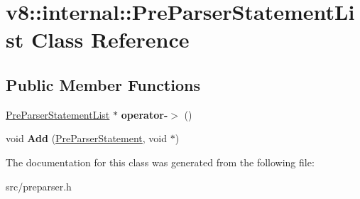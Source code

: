 \hypertarget{classv8_1_1internal_1_1_pre_parser_statement_list}{}\section{v8\+:\+:internal\+:\+:Pre\+Parser\+Statement\+List Class Reference}
\label{classv8_1_1internal_1_1_pre_parser_statement_list}
\subsection*{Public Member Functions}
\begin{DoxyCompactItemize}
\item 
\hypertarget{classv8_1_1internal_1_1_pre_parser_statement_list_af6c533693ed67339eb2b5d7ee93ce9a0}{}\hyperlink{classv8_1_1internal_1_1_pre_parser_statement_list}{Pre\+Parser\+Statement\+List} $\ast$ {\bfseries operator-\/$>$} ()\label{classv8_1_1internal_1_1_pre_parser_statement_list_af6c533693ed67339eb2b5d7ee93ce9a0}

\item 
\hypertarget{classv8_1_1internal_1_1_pre_parser_statement_list_a262be99fb66a0d996b372f9823cc92b7}{}void {\bfseries Add} (\hyperlink{classv8_1_1internal_1_1_pre_parser_statement}{Pre\+Parser\+Statement}, void $\ast$)\label{classv8_1_1internal_1_1_pre_parser_statement_list_a262be99fb66a0d996b372f9823cc92b7}

\end{DoxyCompactItemize}


The documentation for this class was generated from the following file\+:\begin{DoxyCompactItemize}
\item 
src/preparser.\+h\end{DoxyCompactItemize}
